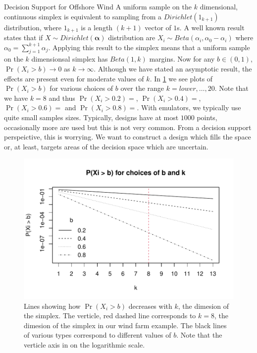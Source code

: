 \begin{chapter}{Decision Support for Offshore Wind \label{Ch:ds-for-ow}}
A uniform sample on the $k$ dimensional, continuous simplex is equivalent to sampling from a $Dirichlet(1_{k+1})$ distribution, where $1_{k+1}$ is a length $(k+1)$ vector of $1$s. A well known result states that if $X \sim Dirichlet(\bm{\alpha})$ distribution are $X_i \sim Beta(\alpha_i, \alpha_0 -  \alpha_i)$ where $\alpha_0 = \sum_{j=1}^{k+1} \alpha_j$. Applying this result to the simplex means that a uniform sample on the $k$ dimensionsal simplex has $Beta(1, k)$ margins. Now for any $b \in (0,1)$, $\Pr (X_i > b) \to 0$ as $k \to \infty$. Although we have stated an asymptotic result, the effects are present even for moderate values of $k$. In \cref{Fig:beta-plot} we see plots of $\Pr (X_i > b)$ for various choices of $b$ over the range $k = lower, \ldots, 20$. Note that we have $k  = 8$ and thus $\Pr(X_i > 0.2) = $, $\Pr(X_i > 0.4) = $, $\Pr(X_i > 0.6) = $ and $\Pr(X_i > 0.8) = $. With emulators, we typically use quite small samples sizes. Typically, designs have at most $1000$ points, occasionally more are used but this is not very common. From a decision support perspeictive, this is worrying. We want to construct a design which fills the space or, at least, targets areas of the decision space which are uncertain.
\begin{figure}
  \centering
  \includegraphics{fig-ds/beta-plot.pdf}
  \caption{Lines showing how $\Pr(X_i > b)$ decreases with $k$, the dimesion of the simplex. The verticle, red dashed line corresponds to $k = 8$, the dimesion of the simplex in our wind farm example. The black lines of various types correspond to different values of $b$. Note that the verticle axis in on the logarithmic scale. \label{Fig:beta-plot}}
\end{figure}

\end{chapter}
